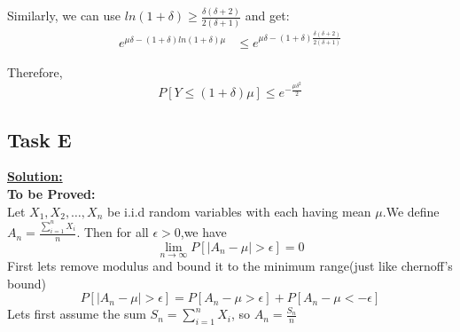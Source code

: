 \documentclass[12pt]{article}
\begin{document}
\begin{enumerate}
\begin{itemize}
Similarly, we can use $ln(1+\delta) \geq \frac{\delta(\delta+2)}{2(\delta+1)}$ and get:
\begin{equation}
\begin{split}
      e^{\mu\delta-(1+\delta)ln(1+\delta)\mu}& \leq e^{\mu\delta-(1+\delta)\frac{\delta(\delta+2)}{2(\delta+1)}}
\end{split}
\end{equation}

Therefore,
\begin{equation}
    P[Y \leq (1+\delta)\mu] \leq e^{-\frac{\mu\delta^2}{2}}
\end{equation}
\end{itemize}
\end{enumerate}
\subsection{Task E} 
\textbf{\underline{Solution:}}\\
\textbf{To be Proved:}\\
Let $X_1,X_2,\dots,X_n$ be i.i.d random variables with each having mean $ \mu $.We define $ A_n = \frac{\sum_{i=1}^nX_i}{n} $. Then for all $ \epsilon > 0 $,we have
\begin{equation}
    \lim_{n\to\infty}P[|A_n - \mu| > \epsilon] = 0
\end{equation}
First lets remove modulus and bound it to the minimum range(just like chernoff's bound)
\begin{equation}
    P[|A_n - \mu| > \epsilon] = P[A_n - \mu > \epsilon] + P[A_n - \mu < -\epsilon]
\end{equation}
Lets first assume the sum $ S_n = \sum_{i=1}^{n}X_i$, so $A_n = \frac{S_n}{n}$
\end{document}
